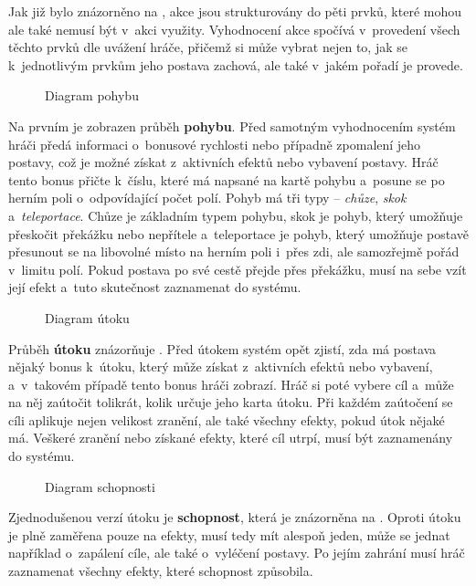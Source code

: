 Jak již bylo znázorněno na , akce jsou strukturovány do pěti prvků, které mohou ale také nemusí být v~akci využity. Vyhodnocení akce spočívá v~provedení všech těchto prvků dle uvážení hráče, přičemž si může vybrat nejen to, jak se k~jednotlivým prvkům jeho postava zachová, ale také v~jakém pořadí je provede.

\begin{figure}[h]
    \centering
    \caption{Diagram pohybu}
    \label{diag:movement}
\end{figure}

Na prvním  je zobrazen průběh \textbf{pohybu}. Před samotným vyhodnocením systém hráči předá informaci o~bonusové rychlosti nebo případně zpomalení jeho postavy, což je možné získat z~aktivních efektů nebo vybavení postavy. Hráč tento bonus přičte k~číslu, které má napsané na kartě pohybu a~posune se po herním poli o~odpovídající počet polí. Pohyb má tři typy -- \textit{chůze}, \textit{skok} a~\textit{teleportace}. Chůze je základním typem pohybu, skok je pohyb, který umožňuje přeskočit překážku nebo nepřítele a~teleportace je pohyb, který umožňuje postavě přesunout se na libovolné místo na herním poli i~přes zdi, ale samozřejmě pořád v~limitu polí. Pokud postava po své cestě přejde přes překážku, musí na sebe vzít její efekt a~tuto skutečnost zaznamenat do systému.

\begin{figure}[h]
    \centering
    \caption{Diagram útoku}
    \label{diag:attack}
\end{figure}

Průběh \textbf{útoku} znázorňuje . Před útokem systém opět zjistí, zda má postava nějaký bonus k~útoku, který může získat z~aktivních efektů nebo vybavení, a~v~takovém případě tento bonus hráči zobrazí. Hráč si poté vybere cíl a~může na něj zaútočit tolikrát, kolik určuje jeho karta útoku. Při každém zaútočení se cíli aplikuje nejen velikost zranění, ale také všechny efekty, pokud útok nějaké má. Veškeré zranění nebo získané efekty, které cíl utrpí, musí být zaznamenány do systému.

\begin{figure}[h]
    \centering
    \caption{Diagram schopnosti}
    \label{diag:skill}
\end{figure}

Zjednodušenou verzí útoku je \textbf{schopnost}, která je znázorněna na . Oproti útoku je plně zaměřena pouze na efekty, musí tedy mít alespoň jeden, může se jednat například o~zapálení cíle, ale také o~vyléčení postavy. Po jejím zahrání musí hráč zaznamenat všechny efekty, které schopnost způsobila.

